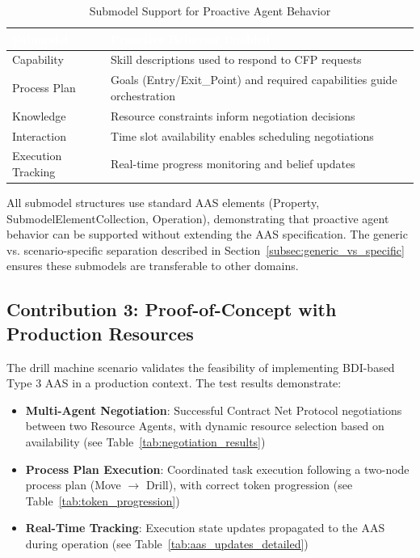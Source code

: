 \begin{table}[ht]
\centering
\caption{Submodel Support for Proactive Agent Behavior}
\label{tab:submodel_contribution}
\begin{tabular}{p{}p{}}
\toprule
\rowcolor{headerblue}
\textcolor{white}{Submodel} & \textcolor{white}{Proactive Behavior Enabled} \\
\midrule
Capability & Skill descriptions used to respond to CFP requests \\
\rowcolor{lightgray}
Process Plan & Goals (Entry/Exit\_Point) and required capabilities guide orchestration \\
Knowledge & Resource constraints inform negotiation decisions \\
\rowcolor{lightgray}
Interaction & Time slot availability enables scheduling negotiations \\
Execution Tracking & Real-time progress monitoring and belief updates \\
\bottomrule
\end{tabular}
\end{table}

All submodel structures use standard \ac{AAS} elements (Property, SubmodelElementCollection, Operation), demonstrating that proactive agent behavior can be supported without extending the \ac{AAS} specification. The generic vs. scenario-specific separation described in Section~\ref{subsec:generic_vs_specific} ensures these submodels are transferable to other domains.

\subsection{Contribution 3: Proof-of-Concept with Production Resources}

The drill machine scenario validates the feasibility of implementing BDI-based Type 3 \ac{AAS} in a production context. The test results demonstrate:

\begin{itemize}
    \item \textbf{Multi-Agent Negotiation}: Successful Contract Net Protocol negotiations between two Resource Agents, with dynamic resource selection based on availability (see Table~\ref{tab:negotiation_results})
    
    \item \textbf{Process Plan Execution}: Coordinated task execution following a two-node process plan (Move $\rightarrow$ Drill), with correct token progression (see Table~\ref{tab:token_progression})
    
    \item \textbf{Real-Time Tracking}: Execution state updates propagated to the \ac{AAS} during operation (see Table~\ref{tab:aas_updates_detailed})
\end{itemize}

